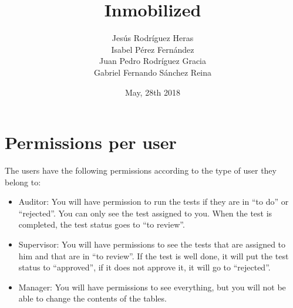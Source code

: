 \documentclass[12pt,letterpaper]{article}
\title{Inmobilized}
\author{Jesús Rodríguez Heras\\Isabel Pérez Fernández\\Juan Pedro Rodríguez Gracia\\Gabriel Fernando Sánchez Reina}
\date{May, 28th 2018}
\begin{document}
	
	\maketitle
	\thispagestyle{empty}
	\newpage
	
	
	\tableofcontents
	\newpage
	
	
	
	
	\lstset{language=bash, numbers=left, numberstyle=\tiny, numbersep=10pt, firstnumber=1, stepnumber=1, basicstyle=\small\ttfamily, tabsize=1, extendedchars=true, inputencoding=latin1}
	
	\section{Permissions per user}
	The users have the following permissions according to the type of user they belong to:
	\begin{itemize}
		\item Auditor: You will have permission to run the tests if they are in ``to do'' or ``rejected''. You can only see the test assigned to you. When the test is completed, the test status goes to ``to review''.
		\item Supervisor: You will have permissions to see the tests that are assigned to him and that are in ``to review''. If the test is well done, it will put the test status to ``approved'', if it does not approve it, it will go to ``rejected''.
		\item Manager: You will have permissions to see everything, but you will not be able to change the contents of the tables.
	\end{itemize}
		
\end{document}
